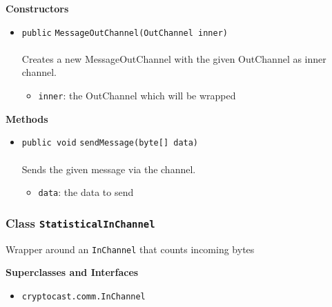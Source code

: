 \textbf{\sffamily Constructors}
\begin{itemize}
\item \lstinline|public| \lstinline|MessageOutChannel|\lstinline|(OutChannel inner)|\\ \\[-0.6em]
Creates a new MessageOutChannel with the given OutChannel as inner channel.
\begin{itemize}
\item \lstinline|inner|: the OutChannel which will be wrapped
\end{itemize}



\end{itemize}


\textbf{\sffamily Methods}
\begin{itemize}
\item \lstinline|public void| \lstinline|sendMessage|\lstinline|(byte[] data)|\\ \\[-0.6em]
Sends the given message via the channel.
\begin{itemize}
\item \lstinline|data|: the data to send
\end{itemize}



\end{itemize}

\subsubsection{Class \lstinline|StatisticalInChannel|}
Wrapper around an \lstinline|InChannel| that counts incoming bytes \\
\noindent\begin{minipage}[t]{5cm}
\vspace{0.3em}
\hspace*{2em}
\vspace{0.3em}
\end{minipage}



\textbf{\sffamily Superclasses and Interfaces}
\begin{itemize}
\item \lstinline|cryptocast.comm.InChannel|
\end{itemize}


